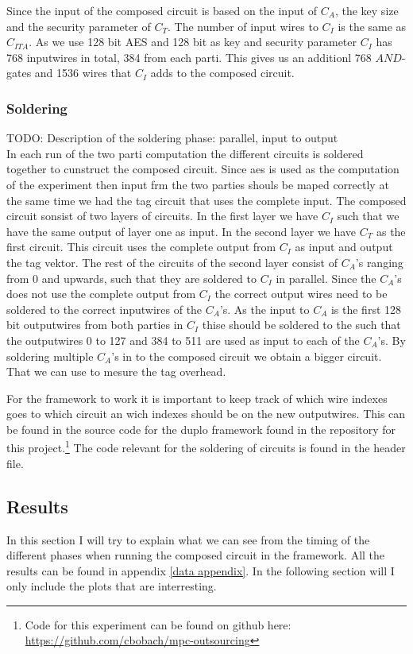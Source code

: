 \documentclass[10pt,a4paper]{article}
\newcommand{\todo}[1]{}
\renewcommand{\todo}[1]{{\color{red} TODO: {#1}} \\}
\begin{document}
Since the input of the composed circuit is based on the input of $C_A$, the key size and the security parameter of $C_T$. The number of input wires to $C_I$ is the same as $C_{ITA}$. As we use 128 bit AES and 128 bit as key and security parameter $C_I$ has 768 inputwires in total, 384 from each parti. This gives us an additionl 768 $AND$-gates and 1536 wires that $C_I$ adds to the composed circuit. 


\subsubsection{Soldering}
\todo{Description of the soldering phase: parallel, input to output}
In each run of the two parti computation the different circuits is soldered together to cunstruct the composed circuit. Since aes is used as the computation of the experiment then input frm the two parties shouls be maped correctly at the same time we had the tag circuit that uses the complete input. The composed circuit sonsist of two layers of circuits. In the first layer we have $C_I$ such that we have the same output of layer one as input. In the second layer we have $C_T$ as the first circuit. This circuit uses the complete output from $C_I$ as input and output the tag vektor. The rest of the circuits of the second layer consist of $C_A$'s ranging from 0 and upwards, such that they are soldered to $C_I$ in parallel. Since the $C_A$'s does not use the complete output from $C_I$ the correct output wires need to be soldered to the correct inputwires of the $C_A$'s. As the input to $C_A$ is the first 128 bit outputwires from both parties in $C_I$ thise should be soldered to the such that the outputwires 0 to 127 and 384 to 511 are used as input to each of the $C_A$'s. By soldering multiple $C_A$'s in to the composed circuit we obtain a bigger circuit. That we can use to mesure the tag overhead.

For the framework to work it is important to keep track of which wire indexes goes to which circuit an wich indexes should be on the new outputwires. This can be found in the source code for the duplo framework found in the repository for this project.\footnote{Code for this experiment can be found on github here: \url{https://github.com/cbobach/mpc-outsourcing}} The code relevant for the soldering of circuits is found in the header file.

\subsection{Results}
In this section I will try to explain what we can see from the timing of the different phases when running the composed circuit in the framework. All the results can be found in appendix \ref{data appendix}. In the following section will I only include the plots that are interresting.
\end{document}
